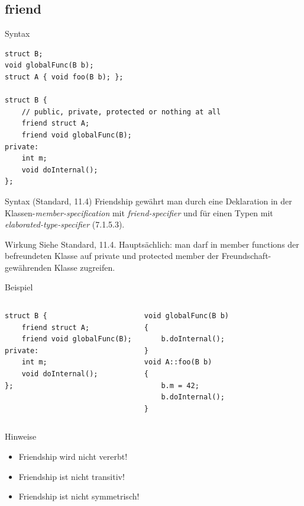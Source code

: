 




\subsection{friend}

\begin{frame}[fragile]{Syntax}
	\begin{lstlisting}
struct B;
void globalFunc(B b);
struct A { void foo(B b); };

struct B {
    // public, private, protected or nothing at all
    friend struct A;
    friend void globalFunc(B);
private:
    int m;
    void doInternal();
};
	\end{lstlisting}
	
	\pause
	
	\begin{block}{Syntax (Standard, 11.4)}
		Friendship gewährt man durch eine Deklaration in der Klassen-\emph{member-specification} mit \emph{friend-specifier} und für einen Typen mit \emph{elaborated-type-specifier} (7.1.5.3).
	\end{block}
\end{frame}


\begin{frame}[fragile]{Wirkung}
	Siehe Standard, 11.4.
	Hauptsächlich: man darf in member functions der befreundeten Klasse auf private und protected member der Freundschaft-gewährenden Klasse zugreifen.
	
	\begin{block}{Beispiel}
		\begin{columns}[t]
			\begin{lstlisting}
struct B {
    friend struct A;
    friend void globalFunc(B);
private:
    int m;
    void doInternal();
};
			\end{lstlisting}
			
			\begin{lstlisting}
void globalFunc(B b)
{
    b.doInternal();
}
void A::foo(B b)
{
    b.m = 42;
    b.doInternal();
}
			\end{lstlisting}
		\end{columns}
	\end{block}
\end{frame}


\begin{frame}{Hinweise}
	\begin{itemize}
		\item Friendship wird nicht vererbt!
		\item Friendship ist nicht transitiv!
		\item Friendship ist nicht symmetrisch!
	\end{itemize}
\end{frame}
